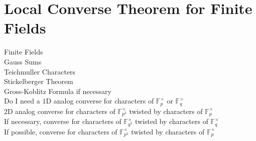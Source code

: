 \chapter{Local Converse Theorem for Finite Fields}	%
Finite Fields \\
Gauss Sums \\
Teichmuller Characters \\
Stickelberger Theorem \\
Gross-Koblitz Formula if necessary \\
Do I need a $1$D analog converse for characters of $\mathbb{F}_p^\times$ or $\mathbb{F}_q^\times$ \\
$2$D analog converse for characters of $\mathbb{F}_{p^2}^\times$ twisted by characters of $\mathbb{F}_{p}^\times$ \\
If necessary, converse for characters of $\mathbb{F}_{q^2}^\times$ twisted by characters of $\mathbb{F}_{q}^\times$ \\
If possible, converse for characters of $\mathbb{F}_{p^3}^\times$ twisted by characters of $\mathbb{F}_{p}^\times$ \\

\endinput